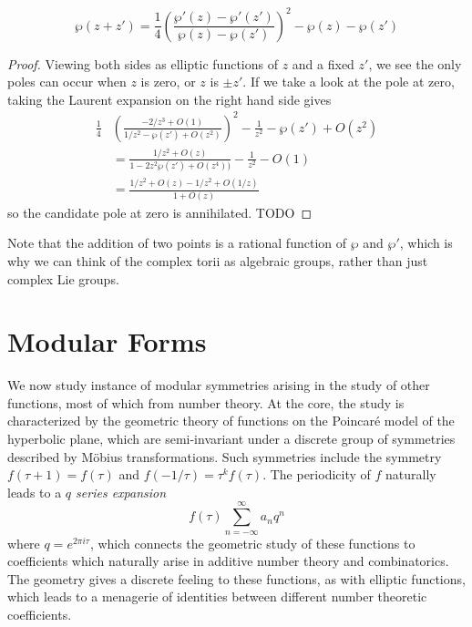 \begin{theorem}
    \[ \wp(z + z') = \frac{1}{4} \left( \frac{\wp'(z) - \wp'(z')}{\wp(z) - \wp(z')} \right)^2 - \wp(z) - \wp(z') \]
\end{theorem}
\begin{proof}
    Viewing both sides as elliptic functions of $z$ and a fixed $z'$, we see the only poles can occur when $z$ is zero, or $z$ is $\pm z'$. If we take a look at the pole at zero, taking the Laurent expansion on the right hand side gives
    \begin{align*}
        \frac{1}{4} & \left( \frac{-2/z^3 + O(1)}{1/z^2 - \wp(z') + O(z^2)} \right)^2 - \frac{1}{z^2} - \wp(z') + O(z^2)\\
        &= \frac{1/z^2 + O(z)}{1 - 2z^2 \wp(z') + O(z^4))} - \frac{1}{z^2} - O(1)\\
        &= \frac{1/z^2 + O(z) - 1/z^2 + O(1/z)}{1 + O(z)}
    \end{align*}
    so the candidate pole at zero is annihilated. TODO
\end{proof}

Note that the addition of two points is a rational function of $\wp$ and $\wp'$, which is why we can think of the complex torii as algebraic groups, rather than just complex Lie groups.

%
%
%
%








\chapter{Modular Forms}

We now study instance of modular symmetries arising in the study of other functions, most of which from number theory. At the core, the study is characterized by the geometric theory of functions on the Poincar\'{e} model of the hyperbolic plane, which are semi-invariant under a discrete group of symmetries described by M\"{o}bius transformations. Such symmetries include the symmetry $f(\tau+1) = f(\tau)$ and $f(-1/\tau) = \tau^k f(\tau)$. The periodicity of $f$ naturally leads to a {\it $q$ series expansion}
%
\[ f(\tau) \sum_{n = -\infty}^\infty a_n q^n \]
%
where $q = e^{2\pi i \tau}$, which connects the geometric study of these functions to coefficients which naturally arise in additive number theory and combinatorics. The geometry gives a discrete feeling to these functions, as with elliptic functions, which leads to a menagerie of identities between different number theoretic coefficients.

